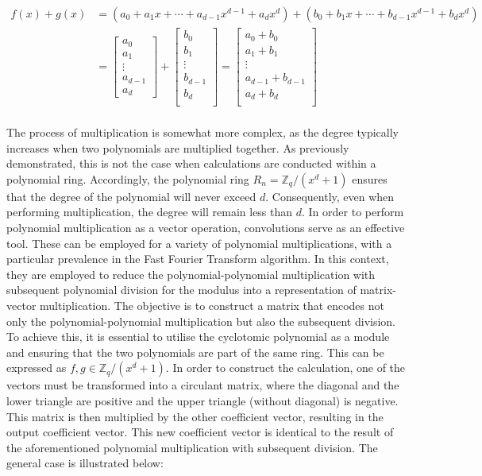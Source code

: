 \begin{align*}
  f(x) + g(x) & = {
  (a_0+ a_1x+\cdots+ a_{d-1}x^{d-1}+a_dx^d)+
  (b_0+ b_1x+\cdots+ b_{d-1}x^{d-1}+b_dx^d)
  }                  \\
              & = {
  \begin{bmatrix}
    a_0     \\
    a_1     \\
    \vdots  \\
    a_{d-1} \\
    a_d
  \end{bmatrix} + 
  \begin{bmatrix}
    b_0     \\
    b_1     \\
    \vdots  \\
    b_{d-1} \\
    b_d     \\
  \end{bmatrix} }     = {
  \begin{bmatrix}
    a_0     +     b_0   \\
    a_1     +  b_1      \\
    \vdots              \\
    a_{d-1} +   b_{d-1} \\
    a_d +   b_d         \\
  \end{bmatrix}
  }                  \\
\end{align*}

The process of multiplication is somewhat more complex, as the degree typically increases when two polynomials are multiplied together. As previously demonstrated, this is not the case when calculations are conducted within a polynomial ring. Accordingly, the polynomial ring $R_n = \mathbb{Z}_q/(x^d+1)$ ensures that the degree of the polynomial will never exceed $d$. Consequently, even when performing multiplication, the degree will remain less than $d$. In order to perform polynomial multiplication as a vector operation, convolutions serve as an effective tool. These can be employed for a variety of polynomial multiplications, with a particular prevalence in the Fast Fourier Transform algorithm. In this context, they are employed to reduce the polynomial-polynomial multiplication with subsequent polynomial division for the modulus into a representation of matrix-vector multiplication. The objective is to construct a matrix that encodes not only the polynomial-polynomial multiplication but also the subsequent division. To achieve this, it is essential to utilise the cyclotomic polynomial as a module and ensuring that the two polynomials are part of the same ring. This can be expressed as $f, g \in \mathbb{Z}_q/(x^d+1)$. In order to construct the calculation, one of the vectors must be transformed into a circulant matrix, where the diagonal and the lower triangle are positive and the upper triangle (without diagonal) is negative. This matrix is then multiplied by the other coefficient vector, resulting in the output coefficient vector. This new coefficient vector is identical to the result of the aforementioned polynomial multiplication with subsequent division. The general case is illustrated below:

